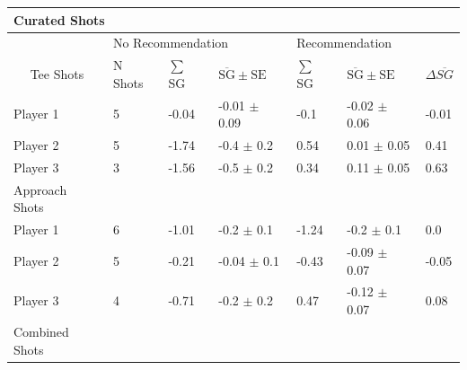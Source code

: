 \documentclass[11pt,a4paper]{article}
\begin{document}
\begin{table}[h!]
\begin{tabular}{lllllll}
\hline \hline
\multicolumn{5}{l}{Curated Shots}                                                                                            \\ \hline
                              & \multicolumn{3}{l|}{No Recommendation}                  & \multicolumn{2}{l}{Recommendation} \\
\multicolumn{1}{c}{Tee Shots} & N Shots & $\sum$ SG & \multicolumn{1}{l|}{$\overline{\text{SG}} \pm \text{SE}$} & $\sum$ SG & $\overline{\text{SG}}\pm \text{SE}$ & $\Delta \overline{SG}$ \\ \hline
Player 1                    & 5  & -0.04     & \multicolumn{1}{l|}{-0.01 $\pm$ 0.09}     & -0.1    & -0.02 $\pm$ 0.06  & -0.01   \\
Player 2                    & 5 & -1.74     & \multicolumn{1}{l|}{-0.4 $\pm$ 0.2}     & 0.54      & 0.01 $\pm$ 0.05  & 0.41    \\
Player 3                    & 3 & -1.56     & \multicolumn{1}{l|}{-0.5 $\pm$ 0.2}     & 0.34     & 0.11 $\pm$  0.05  & 0.63    \\ \hline
Approach Shots \\ \hline
Player 1                    & 6  & -1.01         & \multicolumn{1}{l|}{-0.2 $\pm$ 0.1}   & -1.24   & -0.2 $\pm$ 0.1    &  0.0                 \\
Player 2                    & 5  & -0.21         & \multicolumn{1}{l|}{-0.04 $\pm$ 0.1}   & -0.43   & -0.09 $\pm$ 0.07  &  -0.05                    \\
Player 3                    & 4  & -0.71         & \multicolumn{1}{l|}{-0.2 $\pm$ 0.2}   & 0.47    & -0.12 $\pm$ 0.07  & 0.08 \\ \hline 
Combined Shots \\ \hline

\end{tabular}
\end{table}
\end{document}
